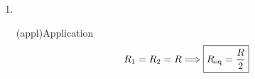 \documentclass[../../main/main.tex]{subfiles}
\begin{document}
{\begin{enumerate}
\begin{tcbraster}[raster columns=2, raster equal height=rows]
\begin{tcb}
				      résultat littéral avant de l'encadrer. Cette erreur est une des plus
				      communes.
			      \end{tcb}
			      \begin{tcb}(appl){Application}
				      En mettant les deux termes sur même dénominateur~:
				      \begin{align*}
					      \frac{1}{ R_{\rm eq}}                 & = \frac{1}{R_1}\times \textcolor{orange}{
						      \frac{R_2}{R_2}} + \frac{1}{R_2}\times \textcolor{orange}{
					      \frac{R_1}{R_1}}                                                                  \\
					      \Leftrightarrow \frac{1}{ R_{\rm eq}} & = \frac{R_2 + R_1}{R_1R_2}                \\
					      \Leftrightarrow R_{\rm eq}            & = \frac{R_1R_2}{R_1+R_2}
				      \end{align*}
			      \end{tcb}
		      \end{tcbraster}

        \item ~
		      \begin{center}
			      \begin{tcb}[width=\linewidth](appl){Application}
				      \[R_1 = R_2 = R \Longrightarrow \boxed{ R_{\rm eq} = \frac{R}{2}}\]
			      \end{tcb}
		      \end{center}


\end{enumerate}}
\end{document}
